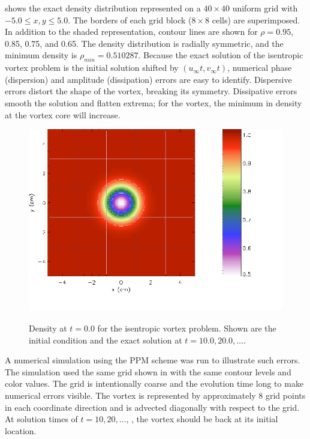  shows the exact density distribution represented on
a $40 \times 40$ uniform grid with $-5.0 \leq x, y \leq 5.0$. The
borders of each grid block ($8 \times 8$ cells) are superimposed. In
addition to the shaded representation, contour lines are shown for
$\rho = 0.95$, 0.85, 0.75, and 0.65. The density distribution is
radially symmetric, and the minimum density is $\rho_{min} =
0.510287$. Because the exact solution of the isentropic vortex
problem is the initial solution shifted by $(u_\infty t, v_\infty
t)$, numerical phase (dispersion) and amplitude (dissipation) errors
are easy to identify. Dispersive errors distort the shape of the
vortex, breaking its symmetry.  Dissipative errors smooth the
solution and flatten extrema; for the vortex, the minimum in density
at the vortex core will increase.
\begin{figure}[!ht]
\begin{center}
{\leavevmode\includegraphics[width=5in]{IsentropicVortex1}}
\end{center}
\caption{\label{Fig:iv1} Density at $t=0.0$ for the isentropic vortex 
problem. Shown are the initial condition and the exact solution
at $t=10.0, 20.0, \ldots$.}
\end{figure}

A numerical simulation using the PPM scheme was run to illustrate
such errors. The simulation used the same grid shown in
 with the same contour levels and color values. The
grid is intentionally coarse and the evolution time long to make
numerical errors visible.  The vortex is represented by
approximately 8 grid points in each coordinate direction and is
advected diagonally with respect to the grid.  At solution times of
$t=10, 20, \ldots$, \etc, the vortex should be back at its initial
location.

